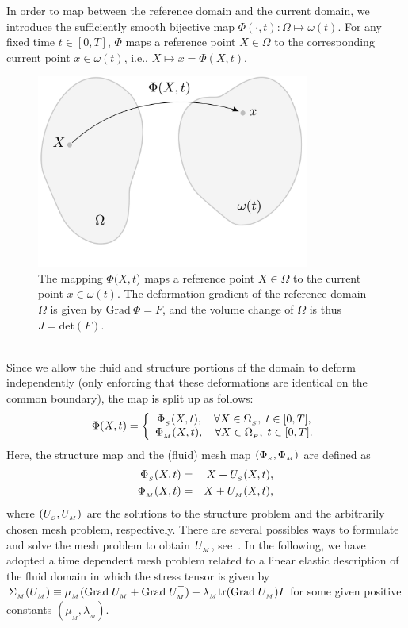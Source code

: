 In order to map between the reference domain and the current domain,
we introduce the sufficiently smooth bijective map $\Phi(\cdot,
t):\Omega\mapsto \omega(t)$.  For any fixed time $t\in[0,T]$, $\Phi$
maps a reference point $X\in\Omega$ to the corresponding current
point $x\in\omega(t)$, i.e., $X \mapsto x = \Phi(X,t)$.
\begin{figure}
  \includegraphics[width=0.8\textwidth]{chapters/selim/pdf/mapping.pdf}
 \caption{The mapping $\Phi(X,t$) maps a reference point $X\in\Omega$
   to the current point $x\in\omega(t)$. The deformation gradient of
   the reference domain $\Omega$ is given by $\textrm{Grad}\:\Phi =
   F$, and the volume change of $\Omega$ is thus $J = \textrm{det}(F)$.}
 \label{selim:fig:mapping}
\end{figure}
\\
Since we allow the fluid and structure portions of the domain to
deform independently (only enforcing that these deformations are
identical on the common boundary), the map is split up as follows:
\begin{equation}
\label{selim:eq:ALEmapI}
\Phi(X,t) =
\left\{
\begin{array}{ccc}
\Phi_{_{S}}(X, t), \quad \forall X\in\Omega_{_{S}},\; t\in[0,T],\\
\Phi_{_{M}}(X, t), \quad \forall X\in\Omega_{_{F}},\; t\in[0,T].
\end{array}
\right.
\end{equation}
Here, the structure map and the (fluid) mesh map $(\Phi_{_{S}}, \Phi_{_{M}})$ are
defined as
\begin{eqnarray}
\label{selim:eq:ALEmapII}
\Phi_{_{S}}(X, t) &=& X + U_{_{S}}(X,t),\\
\Phi_{_{M}}(X, t) &=& X + U_{_{M}}(X,t),
\end{eqnarray}
where $(U_{_{S}}, U_{_{M}})$ are the solutions to the structure problem and the
arbitrarily chosen mesh problem, respectively.  There are several
possibles ways to formulate and solve the mesh problem to obtain
$U_{_{M}}$, see~\cite{HermanssonHansbo2003, LopezNigroStorti2008}.  In the
following, we have adopted a time dependent mesh problem related to a
linear elastic description of the fluid domain in which the stress
tensor is given by $\Sigma_{_{M}}(U_{_{M}})\equiv \mu_{{_M}}(\textrm{Grad}\;U_{_{M}} +
\textrm{Grad}\;U_{_{M}}^{\top})+ \lambda_{_{M}}\textrm{tr}(\textrm{Grad}\;U_{_{M}})I$ for some given
positive constants $(\mu_{{_M}},\lambda_{_{M}})$.

